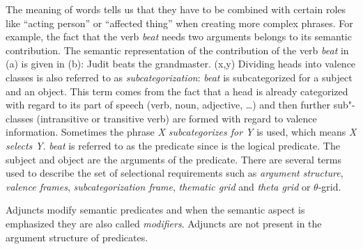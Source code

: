 The meaning of words tells us that they have to be combined with certain roles like ``acting person'' or ``affected thing'' when creating more complex phrases.
For example, the fact that the verb \emph{beat} needs two arguments belongs to its semantic
contribution. The semantic representation of the contribution of the verb \emph{beat} in (a)
is given in (b): 
\eal
\ex Judit beats the grandmaster.
\ex {}(x,y)
\zl
\noindent
Dividing heads into valence classes is also referred to as \emph{subcategorization}:\label{Seite-Subkategoriesierung} 
\emph{beat} is subcategorized for a subject and an object.
This term comes from the fact that a head is already categorized with regard to its
part of speech (verb, noun, adjective, \ldots) and then further sub"-classes (\eg intransitive or
transitive verb) are formed with regard to valence information. Sometimes the phrase \emph{X subcategorizes for Y} is used, which means \emph{X selects Y}.
\emph{beat} is referred to as the predicate since 
 is the logical predicate.
The subject and object are the arguments of the predicate. There are several terms used
to describe the set of selectional requirements such
as \emph{argument structure}, \emph{valence frames},
\emph{subcategorization frame}, \emph{thematic grid} and \emph{theta grid} or $\theta$-grid. 

Adjuncts modify semantic predicates and when the semantic aspect is emphasized they are
also called \emph{modifiers}. Adjuncts are not present in the argument structure
of predicates.

